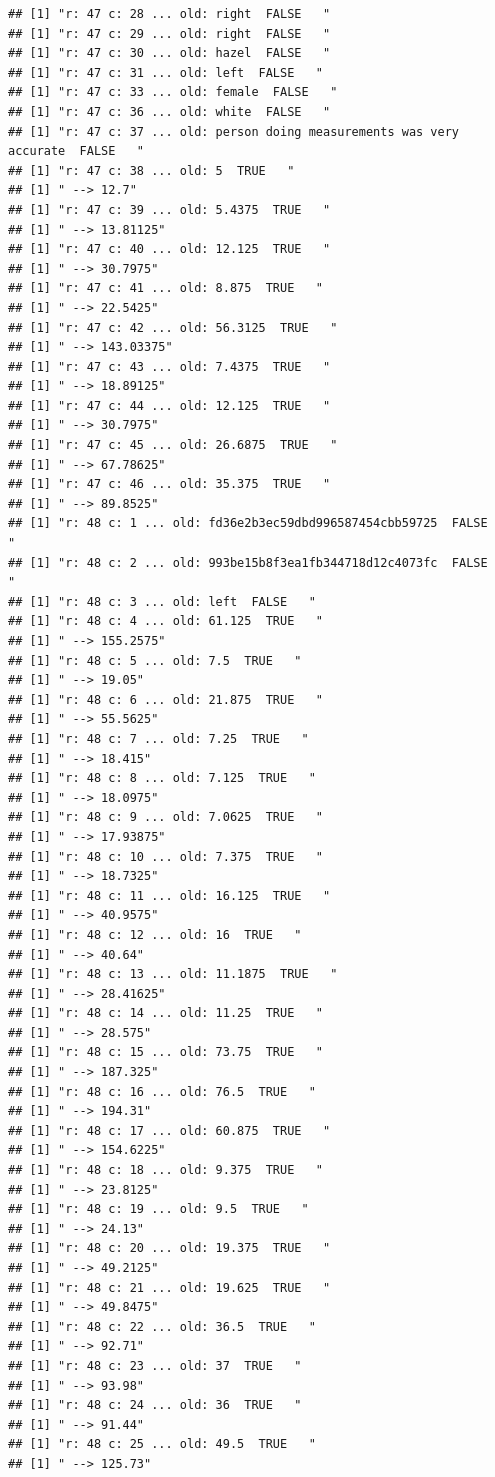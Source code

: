 \documentclass[]{article}
\begin{document}
\begin{verbatim}
## [1] "r: 47 c: 28 ... old: right  FALSE   "
## [1] "r: 47 c: 29 ... old: right  FALSE   "
## [1] "r: 47 c: 30 ... old: hazel  FALSE   "
## [1] "r: 47 c: 31 ... old: left  FALSE   "
## [1] "r: 47 c: 33 ... old: female  FALSE   "
## [1] "r: 47 c: 36 ... old: white  FALSE   "
## [1] "r: 47 c: 37 ... old: person doing measurements was very accurate  FALSE   "
## [1] "r: 47 c: 38 ... old: 5  TRUE   "
## [1] " --> 12.7"
## [1] "r: 47 c: 39 ... old: 5.4375  TRUE   "
## [1] " --> 13.81125"
## [1] "r: 47 c: 40 ... old: 12.125  TRUE   "
## [1] " --> 30.7975"
## [1] "r: 47 c: 41 ... old: 8.875  TRUE   "
## [1] " --> 22.5425"
## [1] "r: 47 c: 42 ... old: 56.3125  TRUE   "
## [1] " --> 143.03375"
## [1] "r: 47 c: 43 ... old: 7.4375  TRUE   "
## [1] " --> 18.89125"
## [1] "r: 47 c: 44 ... old: 12.125  TRUE   "
## [1] " --> 30.7975"
## [1] "r: 47 c: 45 ... old: 26.6875  TRUE   "
## [1] " --> 67.78625"
## [1] "r: 47 c: 46 ... old: 35.375  TRUE   "
## [1] " --> 89.8525"
## [1] "r: 48 c: 1 ... old: fd36e2b3ec59dbd996587454cbb59725  FALSE   "
## [1] "r: 48 c: 2 ... old: 993be15b8f3ea1fb344718d12c4073fc  FALSE   "
## [1] "r: 48 c: 3 ... old: left  FALSE   "
## [1] "r: 48 c: 4 ... old: 61.125  TRUE   "
## [1] " --> 155.2575"
## [1] "r: 48 c: 5 ... old: 7.5  TRUE   "
## [1] " --> 19.05"
## [1] "r: 48 c: 6 ... old: 21.875  TRUE   "
## [1] " --> 55.5625"
## [1] "r: 48 c: 7 ... old: 7.25  TRUE   "
## [1] " --> 18.415"
## [1] "r: 48 c: 8 ... old: 7.125  TRUE   "
## [1] " --> 18.0975"
## [1] "r: 48 c: 9 ... old: 7.0625  TRUE   "
## [1] " --> 17.93875"
## [1] "r: 48 c: 10 ... old: 7.375  TRUE   "
## [1] " --> 18.7325"
## [1] "r: 48 c: 11 ... old: 16.125  TRUE   "
## [1] " --> 40.9575"
## [1] "r: 48 c: 12 ... old: 16  TRUE   "
## [1] " --> 40.64"
## [1] "r: 48 c: 13 ... old: 11.1875  TRUE   "
## [1] " --> 28.41625"
## [1] "r: 48 c: 14 ... old: 11.25  TRUE   "
## [1] " --> 28.575"
## [1] "r: 48 c: 15 ... old: 73.75  TRUE   "
## [1] " --> 187.325"
## [1] "r: 48 c: 16 ... old: 76.5  TRUE   "
## [1] " --> 194.31"
## [1] "r: 48 c: 17 ... old: 60.875  TRUE   "
## [1] " --> 154.6225"
## [1] "r: 48 c: 18 ... old: 9.375  TRUE   "
## [1] " --> 23.8125"
## [1] "r: 48 c: 19 ... old: 9.5  TRUE   "
## [1] " --> 24.13"
## [1] "r: 48 c: 20 ... old: 19.375  TRUE   "
## [1] " --> 49.2125"
## [1] "r: 48 c: 21 ... old: 19.625  TRUE   "
## [1] " --> 49.8475"
## [1] "r: 48 c: 22 ... old: 36.5  TRUE   "
## [1] " --> 92.71"
## [1] "r: 48 c: 23 ... old: 37  TRUE   "
## [1] " --> 93.98"
## [1] "r: 48 c: 24 ... old: 36  TRUE   "
## [1] " --> 91.44"
## [1] "r: 48 c: 25 ... old: 49.5  TRUE   "
## [1] " --> 125.73"

\end{verbatim}
\end{document}
